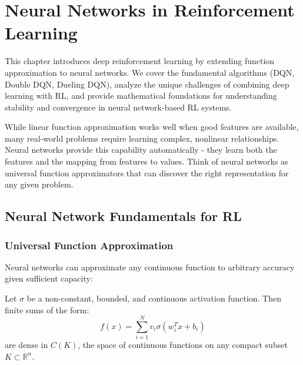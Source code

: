 \chapter{Neural Networks in Reinforcement Learning}
\label{ch:neural-networks-rl}

\begin{keyideabox}
This chapter introduces deep reinforcement learning by extending function approximation to neural networks. We cover the fundamental algorithms (DQN, Double DQN, Dueling DQN), analyze the unique challenges of combining deep learning with RL, and provide mathematical foundations for understanding stability and convergence in neural network-based RL systems.
\end{keyideabox}

\begin{intuitionbox}
While linear function approximation works well when good features are available, many real-world problems require learning complex, nonlinear relationships. Neural networks provide this capability automatically - they learn both the features and the mapping from features to values. Think of neural networks as universal function approximators that can discover the right representation for any given problem.
\end{intuitionbox}

\section{Neural Network Fundamentals for RL}

\subsection{Universal Function Approximation}

Neural networks can approximate any continuous function to arbitrary accuracy given sufficient capacity:

\begin{theorem}
Let $\sigma$ be a non-constant, bounded, and continuous activation function. Then finite sums of the form:
\begin{equation}
f(x) = \sum_{i=1}^N v_i \sigma(w_i^T x + b_i)
\end{equation}
are dense in $C(K)$, the space of continuous functions on any compact subset $K \subset \mathbb{R}^n$.
\end{theorem}

